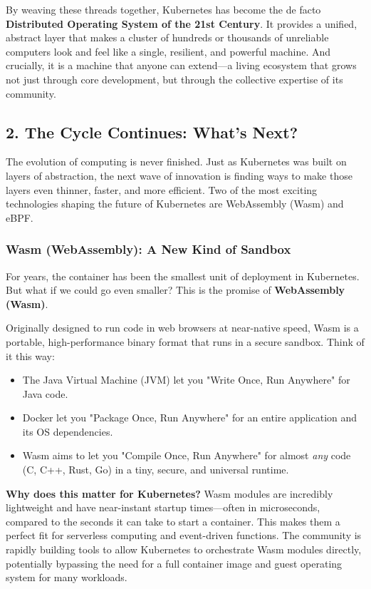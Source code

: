 By weaving these threads together, Kubernetes has become the de facto \textbf{Distributed Operating System of the 21st Century}. It provides a unified, abstract layer that makes a cluster of hundreds or thousands of unreliable computers look and feel like a single, resilient, and powerful machine. And crucially, it is a machine that anyone can extend---a living ecosystem that grows not just through core development, but through the collective expertise of its community.


\subsection{2. The Cycle Continues: What's Next?}


The evolution of computing is never finished. Just as Kubernetes was built on layers of abstraction, the next wave of innovation is finding ways to make those layers even thinner, faster, and more efficient. Two of the most exciting technologies shaping the future of Kubernetes are WebAssembly (Wasm) and eBPF.

\subsubsection{\textbf{Wasm (WebAssembly): A New Kind of Sandbox}}


For years, the container has been the smallest unit of deployment in Kubernetes. But what if we could go even smaller? This is the promise of \textbf{WebAssembly (Wasm)}.

Originally designed to run code in web browsers at near-native speed, Wasm is a portable, high-performance binary format that runs in a secure sandbox. Think of it this way:
\begin{itemize}
\item The Java Virtual Machine (JVM) let you "Write Once, Run Anywhere" for Java code.
\item Docker let you "Package Once, Run Anywhere" for an entire application and its OS dependencies.
\item Wasm aims to let you "Compile Once, Run Anywhere" for almost \textit{any} code (C, C++, Rust, Go) in a tiny, secure, and universal runtime.
\end{itemize}

\textbf{Why does this matter for Kubernetes?}
Wasm modules are incredibly lightweight and have near-instant startup times---often in microseconds, compared to the seconds it can take to start a container. This makes them a perfect fit for serverless computing and event-driven functions. The community is rapidly building tools to allow Kubernetes to orchestrate Wasm modules directly, potentially bypassing the need for a full container image and guest operating system for many workloads.


